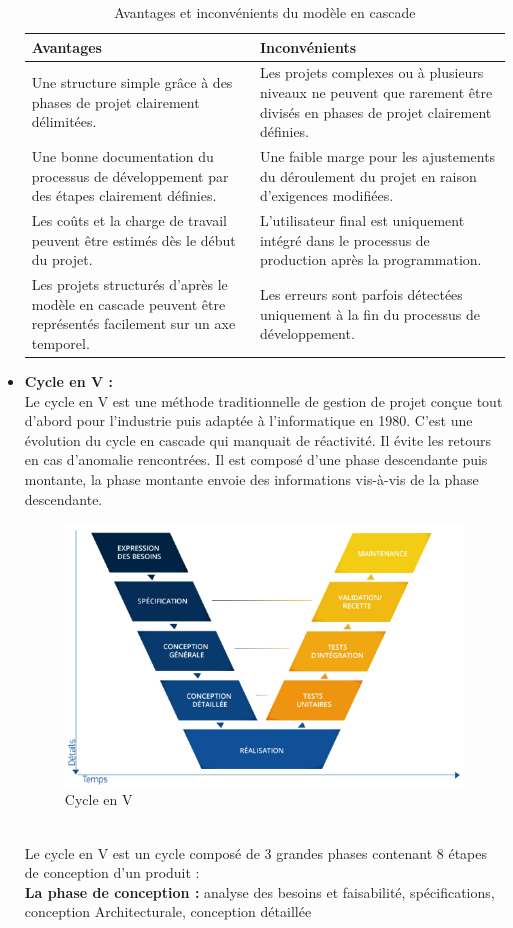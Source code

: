 \documentclass[a4paper, 12pt]{report}
\begin{document}
\begin{itemize}
\begin{table}[H]
\begin{tabular}{|p{6cm}|p{6cm}|} 
\hline  
\centering \textbf{Avantages} & \raggedright  \textbf{Inconvénients} \tabularnewline  
\hline
\raggedright Une structure simple grâce à des phases de projet clairement délimitées.&  Les projets complexes ou à plusieurs niveaux ne peuvent que rarement être divisés en phases de projet clairement définies.   \tabularnewline  
\hline  
\raggedright Une bonne documentation du processus de développement par des étapes clairement définies. & Une faible marge pour les ajustements du déroulement du projet en raison d’exigences modifiées. \tabularnewline
\hline
\raggedright Les coûts et la charge de travail peuvent être estimés dès le début du projet. & L’utilisateur final est uniquement intégré dans le processus de production après la programmation. \tabularnewline
\hline
\raggedright Les projets structurés d’après le modèle en cascade peuvent être représentés facilement sur un axe temporel. & Les erreurs sont parfois détectées uniquement à la fin du processus de développement. \tabularnewline
\hline
\end{tabular}
\caption{Avantages et inconvénients du modèle en cascade}
\end{table}

  \item \textbf{Cycle en V :} \\
  Le cycle en V est une méthode traditionnelle de gestion de projet conçue tout d’abord pour l’industrie puis adaptée à l’informatique en 1980. C’est une évolution du cycle en cascade qui manquait de réactivité. Il évite les retours en cas d’anomalie rencontrées. Il est composé d’une phase descendante puis montante, la phase montante envoie des informations vis-à-vis de la phase descendante. \\
  \begin{figure}[!h]
    \centering
    \includegraphics[width = 1\linewidth]{img/cycle-en-V.png}
    \caption{Cycle en V}
 \end{figure}\\
  Le cycle en V est un cycle composé de 3 grandes phases contenant 8 étapes de conception d’un produit : \\
  \textbf{La phase de conception :} analyse des besoins et faisabilité, spécifications, conception Architecturale, conception détaillée 


\end{itemize}
\end{document}
